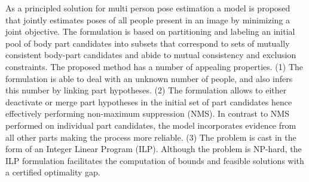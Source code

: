   As a principled solution for multi person pose estimation a model is
  proposed that jointly estimates poses of all people present in an
  image by minimizing a joint objective.  The formulation is based on
  partitioning and labeling an initial pool of body part candidates
  into subsets that correspond to sets of mutually consistent
  body-part candidates and abide to mutual consistency and exclusion
  constraints. The proposed method has a number of appealing
  properties. (1) The formulation is able to deal with an unknown
  number of people, and also infers this number by linking part
  hypotheses. (2) The formulation allows to either deactivate or merge
  part hypotheses in the initial set of part candidates hence
  effectively performing non-maximum suppression (NMS). In contrast to
  NMS performed on individual part candidates, the model incorporates
  evidence from all other parts making the process more reliable.  (3)
  The problem is cast in the form of an Integer Linear Program
  (ILP). Although the problem is NP-hard, the ILP formulation
  facilitates the computation of bounds and feasible solutions with a
  certified optimality gap.







